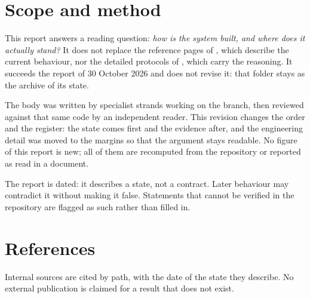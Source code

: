 \documentclass[11pt,a4paper]{article}
\DeclareRobustCommand{\code}[1]{{\small\path{#1}}}
\begin{document}


\section{Scope and method}
\label{sec:scope}

This report answers a reading question: \emph{how is the system built, and where
does it actually stand?} It does not replace the reference pages of \code{docs/},
which describe the current behaviour, nor the detailed protocols of
\code{research/}, which carry the reasoning. It succeeds the report of
30 October 2026 and does not revise it: that folder stays as the archive of its
state.

The body was written by specialist strands working on the \code{dev/1} branch, then
reviewed against that same code by an independent reader. This revision changes
the order and the register: the state comes first and the evidence after, and the
engineering detail was moved to the margins so that the argument stays readable.
No figure of this report is new; all of them are recomputed from the repository or
reported as read in a document.

The report is dated: it describes a state, not a contract. Later behaviour may
contradict it without making it false. Statements that cannot be verified in the
repository are flagged as such rather than filled in.








\section*{References}

Internal sources are cited by path, with the date of the state they describe. No
external publication is claimed for a result that does not exist.
\end{document}
